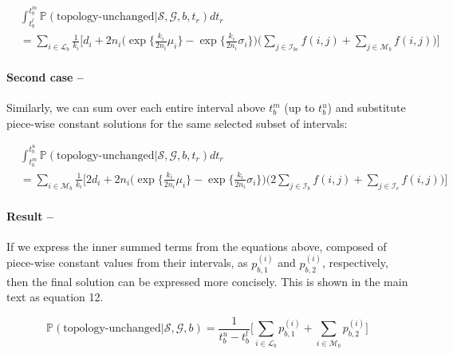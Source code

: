 \documentclass[11pt]{article}
\begin{document}
\begin{equation}
\begin{aligned}
	&\int_{t_b^l}^{t_b^m} {\mathbb{P}(\text{topology-unchanged} | \mathcal{S}, \mathcal{G}, b, t_r)} dt_r \\
	&= \sum_{i \in \mathcal{L}_b} \frac{1}{k_i} \Bigg[ 
		d_i + 2n_i \bigg( 
			\exp \bigg\{\frac{k_i}{2n_i} \mu_i \bigg\} - 
			\exp \bigg\{\frac{k_i}{2n_i} \sigma_i\bigg\} 
		\bigg)
		\bigg(
			\sum_{j \in \mathcal{I}_{bc}} f(i,j) + \sum_{j \in \mathcal{M}_b} f(i,j) 
		\bigg) 
	\Bigg]
\end{aligned}
\end{equation}

\paragraph{Second case --}
Similarly, we can sum over each entire interval above $t_b^m$ (up to $t_b^u$) and substitute piece-wise
constant solutions for the same selected subset of intervals:

\begin{equation}
\begin{aligned}
	&\int_{t_b^m}^{t_b^u} \mathbb{P} (\textrm{topology-unchanged} | \mathcal{S}, \mathcal{G}, b, t_r) dt_r \\
	&= \sum_{i \in \mathcal{M}_b} \frac{1}{k_i} \Bigg[ 
		2d_i + 2n_i \bigg( 
			\exp \bigg\{ \frac{k_i}{2n_i} \mu_i \bigg\} - 
			\exp \bigg\{ \frac{k_i}{2n_i} \sigma_i \bigg\}
		\bigg) 
		\bigg(2 \sum_{j \in \mathcal{I}_b} f(i,j) + \sum_{j \in \mathcal{I}_c} f(i,j) \bigg)
	\Bigg]
\end{aligned}
\end{equation}

\paragraph{Result --}
If we express the inner summed terms from the equations above, composed of piece-wise
constant values from their intervals, as $p_{b,1}^{(i)}$ and $p_{b,2}^{(i)}$, 
respectively, then the final solution can be expressed more concisely. 
This is shown in the main text as equation 12.

\begin{equation}\tag{12}
     \mathbb{P}(\text{topology-unchanged} | \mathcal{S}, \mathcal{G}, b) = 
     \frac{1}{t_b^u - t_b^l} 
     \bigg[ 
	    \sum_{i \in \mathcal{L}_b} p_{b,1}^{(i)} + 
	    \sum_{i \in \mathcal{M}_b} p_{b,2}^{(i)}
	\bigg]
\end{equation}
\end{document}
